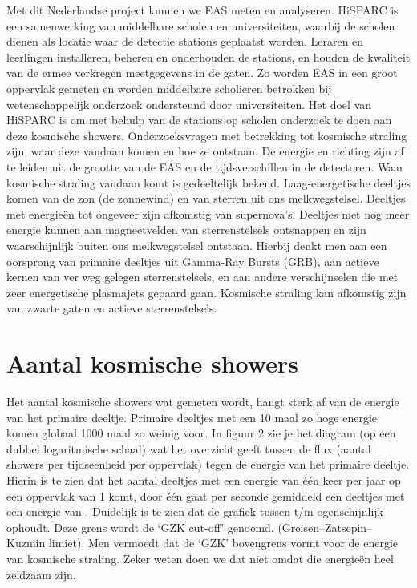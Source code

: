 \Section{\hisparc}

Met dit Nederlandse project kunnen we EAS meten en analyseren. HiSPARC
is een samenwerking van middelbare scholen en universiteiten, waarbij de
scholen dienen als locatie waar de detectie stations geplaatst worden.
Leraren en leerlingen installeren, beheren en onderhouden de stations,
en houden de kwaliteit van de ermee verkregen meetgegevens in de gaten.
Zo worden EAS in een groot oppervlak gemeten en worden middelbare
scholieren betrokken bij wetenschappelijk onderzoek ondersteund door
universiteiten. Het doel van HiSPARC is om met behulp van de stations op
scholen onderzoek te doen aan deze kosmische showers. Onderzoeksvragen
met betrekking tot kosmische straling zijn, waar deze vandaan komen en
hoe ze ontstaan. De energie en richting zijn af te leiden uit de grootte
van de EAS en de tijdsverschillen in de detectoren. Waar kosmische
straling vandaan komt is gedeeltelijk bekend. Laag-energetische deeltjes
komen van de zon (de zonnewind) en van sterren uit ons melkwegstelsel.
Deeltjes met energieën tot ongeveer  \electronvolt zijn
afkomstig van supernova's. Deeltjes met nog meer energie kunnen aan
magneetvelden van sterrenstelsels ontsnappen en zijn waarschijnlijk
buiten ons melkwegstelsel ontstaan. Hierbij denkt men aan een oorsprong
van primaire deeltjes uit Gamma-Ray Bursts (GRB), aan actieve kernen van
ver weg gelegen sterrenstelsels, en aan andere verschijnselen die met
zeer energetische plasmajets gepaard gaan. Kosmische straling kan
afkomstig zijn van zwarte gaten en actieve sterrenstelsels.

\section{Aantal kosmische showers}

Het aantal kosmische showers wat gemeten wordt, hangt sterk af van de
energie van het primaire deeltje. Primaire deeltjes met een 10 maal zo
hoge energie komen globaal 1000 maal zo weinig voor. In figuur 2 zie je
het diagram (op een dubbel logaritmische schaal) wat het overzicht geeft
tussen de flux (aantal showers per tijdseenheid per oppervlak) tegen de
energie van het primaire deeltje. Hierin is te zien dat het aantal
deeltjes met een energie van  \electronvolt één keer per jaar
op een oppervlak van 1 \square\kilo\metre komt, door één \square\metre
gaat per seconde gemiddeld een deeltjes met een energie van 
\electronvolt. Duidelijk is te zien dat de grafiek tussen  t/m
 \electronvolt ogenschijnlijk ophoudt. Deze grens wordt de
‘GZK cut-off’ genoemd. (Greisen–Zatsepin–Kuzmin limiet). Men vermoedt
dat de ‘GZK’ bovengrens vormt voor de energie van kosmische straling.
Zeker weten doen we dat niet omdat die energieën heel zeldzaam zijn.

